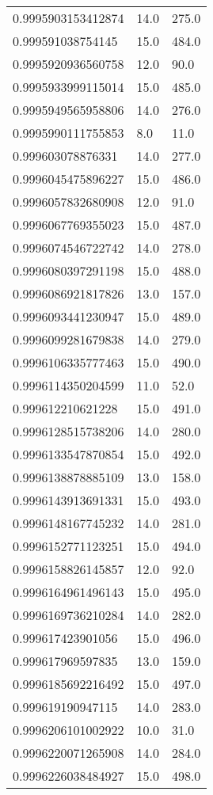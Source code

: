 \begin{center}
\begin{supertabular}[H]{p{0.30\textwidth}p{0.05\textwidth}p{0.05\textwidth}}
0.9995903153412874 & 14.0 & 275.0 \\ 
0.999591038754145 & 15.0 & 484.0 \\ 
0.9995920936560758 & 12.0 & 90.0 \\ 
0.9995933999115014 & 15.0 & 485.0 \\ 
0.9995949565958806 & 14.0 & 276.0 \\ 
0.9995990111755853 & 8.0 & 11.0 \\ 
0.999603078876331 & 14.0 & 277.0 \\ 
0.9996045475896227 & 15.0 & 486.0 \\ 
0.9996057832680908 & 12.0 & 91.0 \\ 
0.9996067769355023 & 15.0 & 487.0 \\ 
0.9996074546722742 & 14.0 & 278.0 \\ 
0.9996080397291198 & 15.0 & 488.0 \\ 
0.9996086921817826 & 13.0 & 157.0 \\ 
0.9996093441230947 & 15.0 & 489.0 \\ 
0.9996099281679838 & 14.0 & 279.0 \\ 
0.9996106335777463 & 15.0 & 490.0 \\ 
0.9996114350204599 & 11.0 & 52.0 \\ 
0.999612210621228 & 15.0 & 491.0 \\ 
0.9996128515738206 & 14.0 & 280.0 \\ 
0.9996133547870854 & 15.0 & 492.0 \\ 
0.9996138878885109 & 13.0 & 158.0 \\ 
0.9996143913691331 & 15.0 & 493.0 \\ 
0.9996148167745232 & 14.0 & 281.0 \\ 
0.9996152771123251 & 15.0 & 494.0 \\ 
0.9996158826145857 & 12.0 & 92.0 \\ 
0.9996164961496143 & 15.0 & 495.0 \\ 
0.9996169736210284 & 14.0 & 282.0 \\ 
0.999617423901056 & 15.0 & 496.0 \\ 
0.999617969597835 & 13.0 & 159.0 \\ 
0.9996185692216492 & 15.0 & 497.0 \\ 
0.999619190947115 & 14.0 & 283.0 \\ 
0.9996206101002922 & 10.0 & 31.0 \\ 
0.9996220071265908 & 14.0 & 284.0 \\ 
0.9996226038484927 & 15.0 & 498.0 \\ 

\end{supertabular}
\end{center}
